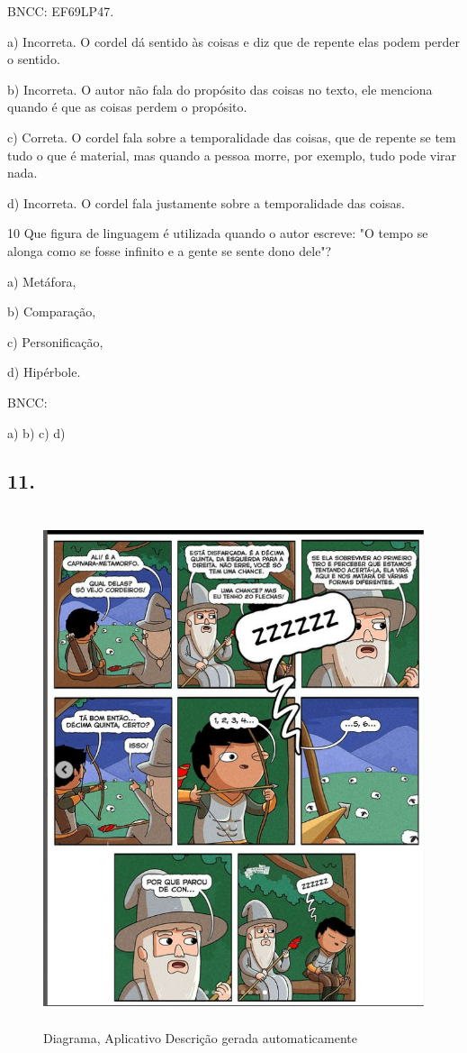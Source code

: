 BNCC: EF69LP47.

a) Incorreta. O cordel dá sentido às coisas e diz que de repente elas
podem perder o sentido.

b) Incorreta. O autor não fala do propósito das coisas no texto, ele
menciona quando é que as coisas perdem o propósito.

c) Correta. O cordel fala sobre a temporalidade das coisas, que de
repente se tem tudo o que é material, mas quando a pessoa morre, por
exemplo, tudo pode virar nada.

d) Incorreta. O cordel fala justamente sobre a temporalidade das coisas.

\num{10} Que figura de linguagem é utilizada quando o autor escreve: "O
tempo se alonga como se fosse infinito e a gente se sente dono dele"?

a) Metáfora,

b) Comparação,

c) Personificação,

d) Hipérbole.

BNCC:

a) b) c) d)

\hypertarget{section-3}{%
\subsection{11.}\label{section-3}}

\begin{figure}
\centering
\includegraphics[width=4.77759in,height=5.95in]{./imgSAEB_6_POR/media/image50.png}
\caption{Diagrama, Aplicativo Descrição gerada automaticamente}
\end{figure}

